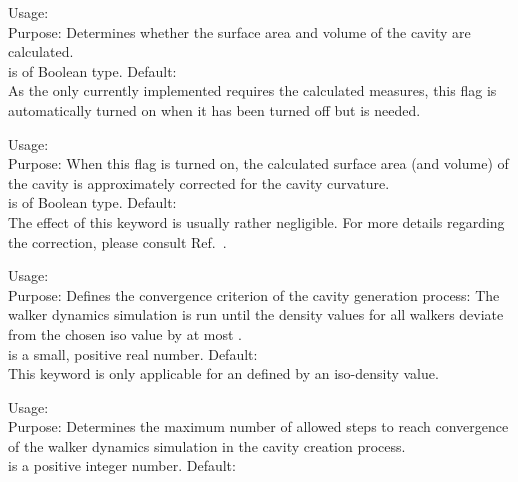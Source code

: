 {
  \noindent
  Usage:   \\[1.0ex] 
  Purpose: Determines whether the surface area and volume 
    of the cavity are calculated. \\[1.0ex]
   is of Boolean type. Default:  \\
}
As the only currently implemented  
 requires 
the calculated measures, this flag is automatically turned on 
when it has been turned off but is needed. 

{
  \noindent
  Usage:   \\[1.0ex] 
  Purpose: When this flag is turned on, the calculated surface 
    area (and volume) of the cavity is approximately corrected 
    for the cavity curvature. \\[1.0ex]
   is of Boolean type. Default:  \\
}
The effect of this keyword is usually rather negligible. 
For more details regarding the correction, please consult 
Ref.~\cite{Sinstein2017_MPE}. 


{
  \noindent
  Usage:  
     \\[1.0ex] 
  Purpose: Defines the convergence criterion of the 
    cavity generation process: The walker dynamics simulation 
    is run until the density values for all walkers deviate 
    from the chosen iso value by at most . \\[1.0ex]
   is a small, positive real number. 
    Default:  \\
}
This keyword is only applicable for an  
defined by an iso-density value. 

{
  \noindent
  Usage:   \\[1.0ex] 
  Purpose: Determines the maximum number of allowed steps 
    to reach convergence of the walker dynamics simulation 
    in the cavity creation process. \\[1.0ex]
   is a positive integer number. Default:  \\
}

